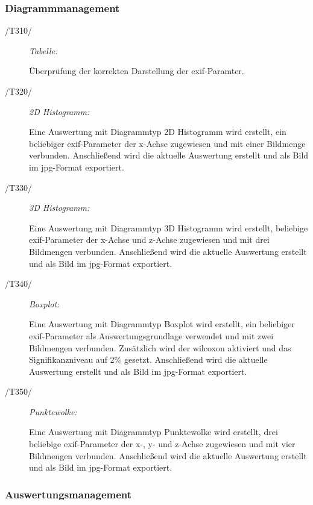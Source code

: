 	\subsubsection{Diagrammmanagement}
	
		\begin{description}
			
			\item[/T310/] \textit{Tabelle:}\par Überprüfung der korrekten Darstellung der \gls{exif}-Paramter. 

			\item[/T320/] \textit{2D Histogramm:}\par	Eine Auswertung mit Diagrammtyp 2D Histogramm wird erstellt, ein beliebiger \gls{exif}-Parameter der x-Achse zugewiesen und mit einer Bildmenge verbunden. Anschließend wird die aktuelle Auswertung erstellt und als Bild im \gls{jpg}-Format exportiert.
		
			\item[/T330/] \textit{3D Histogramm:}\par Eine Auswertung mit Diagrammtyp 3D Histogramm wird erstellt, beliebige \gls{exif}-Parameter der x-Achse und z-Achse zugewiesen und mit drei Bildmengen verbunden. Anschließend wird die aktuelle Auswertung erstellt und als Bild im \gls{jpg}-Format exportiert.

			\item[/T340/] \textit{Boxplot:}\par Eine Auswertung mit Diagrammtyp Boxplot wird erstellt, ein beliebiger \gls{exif}-Parameter als Auswertungsgrundlage verwendet und mit zwei Bildmengen verbunden. Zusätzlich wird der \gls{wilcoxon} aktiviert und das Signifikanzniveau auf 2\% gesetzt. Anschließend wird die aktuelle Auswertung erstellt und als Bild im \gls{jpg}-Format exportiert.

			\item[/T350/] \textit{Punktewolke:}\par	Eine Auswertung mit Diagrammtyp Punktewolke wird erstellt, drei beliebige \gls{exif}-Parameter der x-, y- und z-Achse zugewiesen und mit vier Bildmengen verbunden. Anschließend wird die aktuelle Auswertung erstellt und als Bild im \gls{jpg}-Format exportiert.

		\end{description}
	
	\subsubsection{Auswertungsmanagement}


